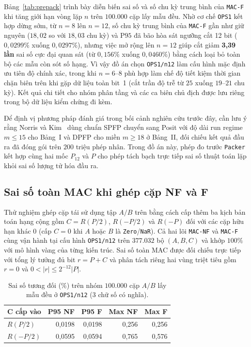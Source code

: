 Bảng~\ref{tab:prepack} trình bày diễn biến sai số và số chu kỳ trung bình của
\texttt{MAC-F} khi tăng giới hạn vòng lặp $n$ trên $100.000$ cặp lấy mẫu đều.
Nhờ cơ chế \texttt{OPS1} kết hợp dừng sớm, từ $n=8$ lên $n=12$, số chu kỳ trung
bình của \texttt{MAC-F} gần như giữ nguyên ($18{,}02$ so với $18{,}03$ chu kỳ)
và $\mathrm{P95}$ đã bão hòa sát ngưỡng cắt 12 bit ($0{,}0299\%$ xuống $0{,}0297\%$),
nhưng việc mở rộng lên $n=12$ giúp cắt giảm \textbf{3,39 lần} sai số cực đại
quan sát (từ $0{,}156\%$ xuống $0{,}0460\%$) bằng cách loại bỏ toàn bộ các mẫu
còn sót số hạng. Vì vậy đồ án chọn \texttt{OPS1/n12} làm cấu hình mặc định ưu tiên
độ chính xác, trong khi $n=6\text{--}8$ phù hợp làm chế độ tiết kiệm thời gian
chặn biên trên khi gặp dữ liệu toàn bit~1 (cắt trần độ trễ từ $25$ xuống
$19\text{--}21$ chu kỳ). Kết quả chi tiết cho nhóm phân tầng và các ca biên chủ
địch được lưu riêng trong bộ dữ liệu kiểm chứng đi kèm.


Để định vị phương pháp đánh giá trong bối cảnh nghiên cứu trước đây, cần lưu ý rằng
Norris và Kim~\cite{norris2021iterativeposit} dùng chuẩn SPFP chuyển sang Posit
với độ dài run regime $m \le 15$ cho Bảng~I và DPFP cho miền $m \ge 18$ ở Bảng~II,
đối chiếu kết quả đầu ra đã đóng gói trên $200$ triệu phép nhân. Trong đồ án này,
phép đo trước \texttt{Packer} kết hợp cùng hai mốc $P_{12}$ và $P$ cho phép tách
bạch trực tiếp sai số thuật toán lặp khỏi sai số lượng tử hóa đầu ra.

\subsection{Sai số toàn MAC khi ghép cặp NF và F}
Thử nghiệm ghép cặp tái sử dụng tập $A/B$ trên bằng cách cấp thêm ba kịch bản toán
hạng cộng gồm $C = R(P/2)$, $R(-P/2)$ và $R(-P)$ đối với các cặp hữu hạn khác $0$
(cấp $C=0$ khi $A$ hoặc $B$ là \texttt{Zero}/\texttt{NaR}). Cả hai lõi \texttt{MAC-NF}
và \texttt{MAC-F} cùng vận hành tại cấu hình \texttt{OPS1/n12} trên $377.032$ bộ
$(A,B,C)$ và khớp $100\%$ với mô hình vàng của từng kiến trúc. Sai số toàn MAC được
đối chiếu trực tiếp với tổng lý tưởng đủ bit $r = P + C$ và phân tách riêng hai vùng
triệt tiêu gồm $r = 0$ và $0 < |r| \le 2^{-12}|P|$.

\begin{table}[htbp]
  \centering
  \small
  \caption{Sai số tương đối (\%) trên nhóm $100.000$ cặp $A/B$ lấy mẫu đều ở \texttt{OPS1/n12} (3 chữ số có nghĩa).}
  \label{tab:paired-mac}
  \begin{tabular}{lrrrr}
    \toprule
    C cấp vào & P95 NF & P95 F & Max NF & Max F \\
    \midrule
    $R(P/2)$  & 0,0198 & 0,0198 & 0,256 & 0,256 \\
    $R(-P/2)$ & 0,0595 & 0,0594 & 0,765 & 0,576 \\
    \bottomrule
  \end{tabular}
\end{table}

